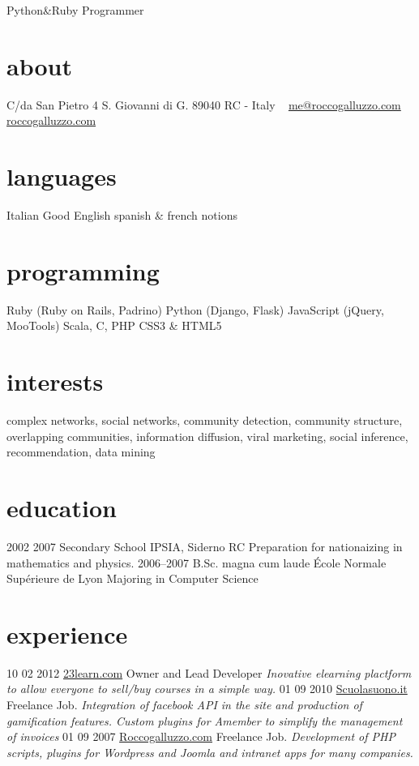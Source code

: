 \documentclass[]{friggeri-cv}
\begin{document}
       {Python\&Ruby Programmer}

\begin{aside}
  \section{about}
    C/da San Pietro 4
    S. Giovanni di G.
    89040 RC - Italy
    ~
    \href{mailto:me@roccogalluzzo.com}{me@roccogalluzzo.com}
    \href{http://roccogalluzzo.com}{roccogalluzzo.com}
  \section{languages}
    Italian
    Good English 
    spanish \& french notions
  \section{programming}
    Ruby
    (Ruby on Rails, Padrino)
    Python
    (Django, Flask)
    JavaScript
    (jQuery, MooTools)
    Scala, C, PHP
    CSS3 \& HTML5
\end{aside}

\section{interests}

complex networks, social networks, community detection, community structure,
overlapping communities, information diffusion, viral marketing, social
inference, recommendation, data mining

\section{education}

\begin{entrylist}

  \entry
    {2002 2007}
    {Secondary School}
    {IPSIA, Siderno RC}
    {Preparation for nationaizing in mathematics and physics.}
     \entry
    {2006–2007}
    {B.Sc. magna cum laude}
    {École Normale Supérieure de Lyon}
    {Majoring in Computer Science}
\end{entrylist}

\section{experience}

\begin{entrylist}
  \entry
    {10 02 2012}
     {\href{http://www.23learn.com}{23learn.com}}
    {Owner and Lead Developer}
    {\emph{Inovative elearning plactform to allow everyone to sell/buy courses in a simple way. }}
  \entry
    {01 09 2010}
    {\href{http://www.scuolasuono.it}{Scuolasuono.it}}
    {Freelance Job.}
    {\emph{Integration of facebook API in the site and production of gamification features. Custom plugins for Amember to simplify the management of invoices}}
  \entry
    {01 09 2007}
    {\href{http://roccogalluzzo.com}{Roccogalluzzo.com}}
    {Freelance Job.}
    {\emph{Development of PHP scripts, plugins for Wordpress and Joomla and intranet apps for many companies.}}
\end{entrylist}
\end{document}
